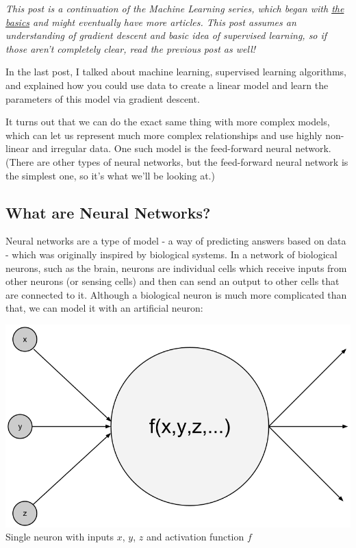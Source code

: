 \documentclass{article}
\begin{document}
\emph{This post is a continuation of the Machine Learning series, which began with
\href{http://andrew.gibiansky.com/blog/machine-learning/machine-learning-the-basics}{the basics} 
and might eventually have more articles. This post assumes an understanding of
gradient descent and basic idea of supervised learning, so if those aren't
completely clear, read the previous post as well!}

In the last post, I talked about machine learning, supervised learning
algorithms, and explained how you could use data to create a linear model and
learn the parameters of this model via gradient descent.

It turns out that we can do the exact same thing with more complex models,
which can let us represent much more complex relationships and use highly
non-linear and irregular data. One such model is the feed-forward neural
network. (There are other types of neural networks, but the feed-forward neural
network is the simplest one, so it's what we'll be looking at.)

\subsection*{What are Neural Networks?}

Neural networks are a type of model - a way of predicting answers based on data
- which was originally inspired by biological systems. In a network of
biological neurons, such as the brain, neurons are individual cells which
receive inputs from other neurons (or sensing cells) and then can send an
output to other cells that are connected to it. Although a biological neuron is
much more complicated than that, we can model it with an artificial neuron:

\begin{center}
    \includegraphics[scale=0.5]{images/neuron.png} \\
    Single neuron with inputs $x$, $y$, $z$ and activation function $f$
\end{center}
\end{document}
